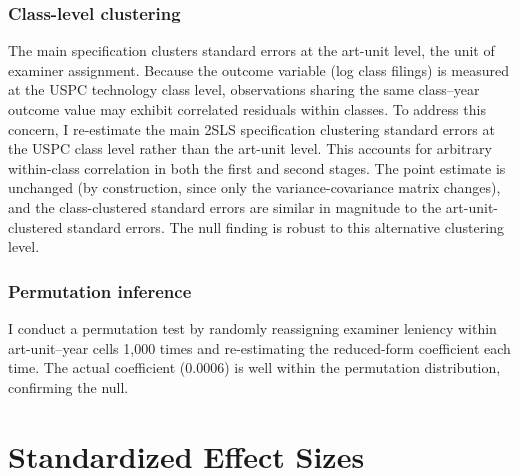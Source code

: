 \documentclass[12pt]{article}
\begin{document}
\subsubsection*{Class-level clustering} The main specification clusters standard errors at the art-unit level, the unit of examiner assignment. Because the outcome variable (log class filings) is measured at the USPC technology class level, observations sharing the same class--year outcome value may exhibit correlated residuals within classes. To address this concern, I re-estimate the main 2SLS specification clustering standard errors at the USPC class level rather than the art-unit level. This accounts for arbitrary within-class correlation in both the first and second stages. The point estimate is unchanged (by construction, since only the variance-covariance matrix changes), and the class-clustered standard errors are similar in magnitude to the art-unit-clustered standard errors. The null finding is robust to this alternative clustering level.

\subsubsection*{Permutation inference} I conduct a permutation test by randomly reassigning examiner leniency within art-unit--year cells 1,000 times and re-estimating the reduced-form coefficient each time. The actual coefficient (0.0006) is well within the permutation distribution, confirming the null.


\section{Standardized Effect Sizes}
\label{sec:sde}


\end{document}
